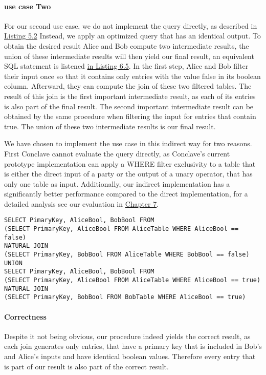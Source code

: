 \paragraph{use case Two}
\label{use_case2}
For our second use case, we do not implement the query directly, as described in \hyperref[SQL2_label]{Listing 5.2}  Instead, we apply an optimized query that has an identical output. To obtain the desired result Alice and Bob compute two intermediate results, the union of these intermediate results will then yield our final result, an equivalent SQL statement is listened \hyperref[use_case2_alternative_sql]{ in Listing 6.5}.
In the first step, Alice and Bob filter their input once so that it contains only entries with the value false in its boolean column. Afterward, they can compute the join of these two filtered tables. The result of this join is the first important intermediate result, as each of its entries is also part of the final result. The second important intermediate result can be obtained by the same procedure when filtering the input for entries that contain true.
The union of these two intermediate results is our final result. 

We have chosen to implement the use case in this indirect way for two reasons. First Conclave cannot evaluate the query directly, as Conclave's current prototype implementation can apply a WHERE filter exclusivity to a table that is either the direct input of a party or the output of a unary operator, that has only one table as input. Additionally, our indirect implementation has a significantly better performance compared to the direct implementation, for a detailed analysis see our evaluation in \hyperref[evaluation]{Chapter 7}.   


\label{use_case2_alternative_sql}
\begin{lstlisting}[caption={Functional equivalent SQL statement for our optimitized implementation of our second use case}]
SELECT PimaryKey, AliceBool, BobBool FROM
(SELECT PrimaryKey, AliceBool FROM AliceTable WHERE AliceBool == false) 
NATURAL JOIN	
(SELECT PrimaryKey, BobBool FROM AliceTable WHERE BobBool == false)	
UNION
SELECT PimaryKey, AliceBool, BobBool FROM
(SELECT PrimaryKey, AliceBool FROM AliceTable WHERE AliceBool == true) 
NATURAL JOIN	
(SELECT PrimaryKey, BobBool FROM BobTable WHERE AliceBool == true)
\end{lstlisting}

\paragraph{Correctness}
Despite it not being obvious, our procedure indeed yields the correct result, as each join generates only entries, that have a primary key that is included in Bob's and Alice's inputs and have identical boolean values. Therefore every entry that is part of our result is also part of the correct result.

